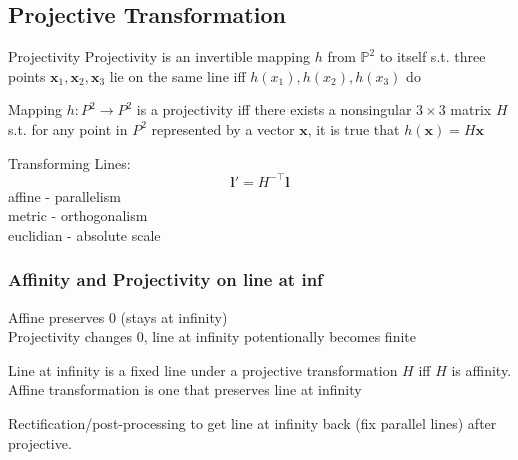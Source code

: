 \documentclass{article}
\begin{document}
\subsection{Projective Transformation}
\begin{definition}
    {Projectivity}{}
    Projectivity is an invertible mapping $h$ from $\mathbb P^2$ to itself s.t. 
    three points $\mathbf x_1,\mathbf x_2,\mathbf x_3$ lie on the same line iff $h(x_1), h(x_2), h(x_3)$
    do
\end{definition}

\begin{thm}
    {}{}
    Mapping $h: P^2 \to P^2$ is a projectivity iff there exists a 
    nonsingular $3\times 3$ matrix $H$ s.t. for any point in $P^2$ represented by a 
    vector $\mathbf x$, it is true that $h(\mathbf x) = H\mathbf x$
\end{thm}






\noindent
Transforming Lines:
\[
    \mathbf l ' = H^{-\top} \mathbf l
\]
\noindent
affine - parallelism\\
metric - orthogonalism\\
euclidian - absolute scale



\subsubsection{Affinity and Projectivity on line at inf}
Affine preserves $0$ (stays at infinity)\\
Projectivity changes $0$, line at infinity potentionally becomes finite
\begin{thm}
    {}{}
    Line at infinity is a fixed line under a projective transformation $H$ iff
    $H$ is affinity.\\
    Affine transformation is one that preserves line at infinity
\end{thm}
\noindent
Rectification/post-processing to get line at infinity back (fix parallel lines) after
projective. 
\end{document}
